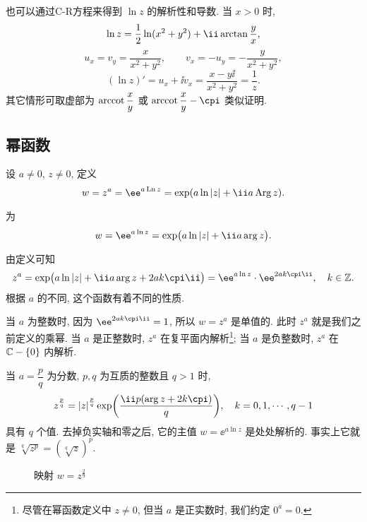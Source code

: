 也可以通过C-R方程来得到 $\ln z$ 的解析性和导数.
当 $x>0$ 时,
\[
  \ln z=\half \ln(x^2+y^2)+\ii\arctan \frac yx,
\]
\[
  u_x=v_y=\frac x{x^2+y^2},\qquad v_x=-u_y=-\frac y{x^2+y^2},
\]
\[
  (\ln z)'=u_x+\ii v_x=\frac{x-y\ii}{x^2+y^2}=\frac 1z.
\]
其它情形可取虚部为 $\operatorname{arccot}\dfrac xy$ 或 $\arccot\dfrac xy-\cpi$ 类似证明.


\subsection{幂函数}
\label{ssec:power-function}

\begin{definition}
  \begin{enuma}
    \item 设 $a\neq 0$, $z\neq 0$, 定义
      \[
        w=z^a=\ee^{a\Ln z}
        =\exp(a\ln\abs{z}+\ii a\Arg z).
      \]
    \item {}为
      \[
        w=\ee^{a\ln z}=\exp\bigl(a\ln\abs{z}+\ii a\arg z\bigr).
      \]
  \end{enuma}
\end{definition}

由定义可知
\[
   z^a
  =\exp\bigl(a\ln\abs{z}+\ii a\arg z+2ak\cpi\ii\bigr)
  =\ee^{a\ln z}\cdot \ee^{2ak\cpi\ii},
    \quad k\in\BZ.
\]
根据 $a$ 的不同, 这个函数有着不同的性质.

当 $a$ 为整数时, 因为 $\ee^{2ak\cpi\ii}=1$, 所以 $w=z^a$ 是单值的. 此时 $z^a$ 就是我们之前定义的乘幂. 
当 $a$ 是正整数时, $z^a$ 在复平面内解析\footnote{%
  尽管在幂函数定义中 $z\neq 0$, 但当 $a$ 是正实数时, 我们约定 $0^a=0$.
};
当 $a$ 是负整数时, $z^a$ 在 ${\mathbb{C}}-\{0\}$ 内解析.

当 $a=\dfrac pq$ 为分数, $p,q$ 为互质的整数且 $q>1$ 时,
\[
   z^{\frac pq}
  =\abs{z}^{\frac pq}\exp\biggl(\frac{\ii p(\arg z+2k\cpi)}q\biggr),
    \quad k=0,1,\cdots,q-1
\]
具有 $q$ 个值.
去掉负实轴和零之后, 它的主值 $w=\ee^{a\ln z}$ 是处处解析的.
事实上它就是 $\sqrt[q]{z^p}=(\sqrt[q]z)^p$.

\begin{figure}[H]
  \centering
  \caption{映射 $w=z^{\frac29}$}
\end{figure}

